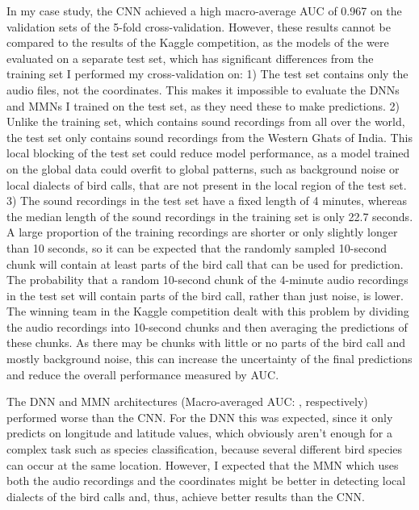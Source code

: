 \documentclass[12pt,twoside]{scrreport}
\begin{document}
In my case study, the CNN achieved a high macro-average AUC of 0.967 on the validation sets of the 5-fold cross-validation. However, these results cannot be compared to the results of the Kaggle competition, as the models of the were evaluated on a separate test set, which has significant differences from the training set I performed my cross-validation on: 1) The test set contains only the audio files, not the coordinates. This makes it impossible to evaluate the DNNs and MMNs I trained on the test set, as they need these to make predictions. 2) Unlike the training set, which contains sound recordings from all over the world, the test set only contains sound recordings from the Western Ghats of India. This local blocking of the test set could reduce model performance, as a model trained on the global data could overfit to global patterns, such as background noise or local dialects of bird calls, that are not present in the local region of the test set. 3) The sound recordings in the test set have a fixed length of 4 minutes, whereas the median length of the sound recordings in the training set is only 22.7 seconds. A large proportion of the training recordings are shorter or only slightly longer than 10 seconds, so it can be expected that the randomly sampled 10-second chunk will contain at least parts of the bird call that can be used for prediction. The probability that a random 10-second chunk of the 4-minute audio recordings in the test set will contain parts of the bird call, rather than just noise, is lower. The winning team in the Kaggle competition dealt with this problem by dividing the audio recordings into 10-second chunks and then averaging the predictions of these chunks. As there may be chunks with little or no parts of the bird call and mostly background noise, this can increase the uncertainty of the final predictions and reduce the overall performance measured by AUC. 

The DNN and MMN architectures (Macro-averaged AUC: , respectively) performed worse than the CNN. For the DNN this was expected, since it only predicts on longitude and latitude values, which obviously aren't enough for a complex task such as species classification, because several different bird species can occur at the same location. However, I expected that the MMN which uses both the audio recordings and the coordinates might be better in detecting local dialects of the bird calls and, thus, achieve better results than the CNN. 

\end{document}
